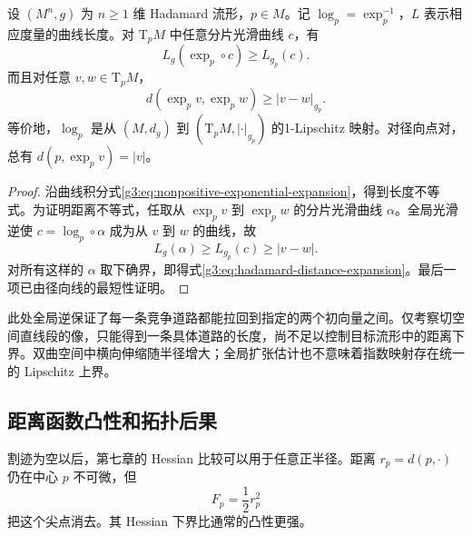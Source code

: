 \begin{proposition}\label{g3:prop:hadamard-exponential-expansion}
	设 \((M^n,g)\) 为 \(n\ge1\) 维 Hadamard 流形，\(p\in M\)。记 \(\log_p=\exp_p^{-1}\)，\(L\) 表示相应度量的曲线长度。对 \(\mathrm{T}_pM\) 中任意分片光滑曲线 \(c\)，有
	\[
		L_g(\exp_p\circ c)\ge L_{g_p}(c).
	\]
	而且对任意 \(v,w\in\mathrm{T}_pM\)，
	\begin{equation}\label{g3:eq:hadamard-distance-expansion}
		d(\exp_pv,\exp_pw)\ge|v-w|_{g_p}.
	\end{equation}
	等价地，\(\log_p\) 是从 \((M,d_g)\) 到 \((\mathrm{T}_pM,|\cdot|_{g_p})\) 的1-Lipschitz 映射。对径向点对，总有 \(d(p,\exp_pv)=|v|\)。
\end{proposition}
\begin{proof}
	沿曲线积分式\eqref{g3:eq:nonpositive-exponential-expansion}，得到长度不等式。为证明距离不等式，任取从 \(\exp_pv\) 到 \(\exp_pw\) 的分片光滑曲线 \(\alpha\)。全局光滑逆使 \(c=\log_p\circ\alpha\) 成为从 \(v\) 到 \(w\) 的曲线，故
	\[
		L_g(\alpha)\ge L_{g_p}(c)\ge|v-w|.
	\]
	对所有这样的 \(\alpha\) 取下确界，即得式\eqref{g3:eq:hadamard-distance-expansion}。最后一项已由径向线的最短性证明。
\end{proof}

此处全局逆保证了每一条竞争道路都能拉回到指定的两个初向量之间。仅考察切空间直线段的像，只能得到一条具体道路的长度，尚不足以控制目标流形中的距离下界。双曲空间中横向伸缩随半径增大；全局扩张估计也不意味着指数映射存在统一的 Lipschitz 上界。

\subsection{距离函数凸性和拓扑后果}
\label{g3:subsec:0901:04}

割迹为空以后，第七章的 Hessian 比较可以用于任意正半径。距离 \(r_p=d(p,\cdot)\) 仍在中心 \(p\) 不可微，但
\[
	F_p=\frac12r_p^2
\]
把这个尖点消去。其 Hessian 下界比通常的凸性更强。

